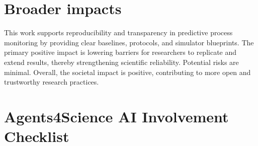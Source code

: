 \documentclass{article}
\theoremstyle{plain}
\theoremstyle{definition}
\theoremstyle{remark}
\begin{document}
	
	
	\section{Broader impacts}
	\label{sec:broader_impacts}
	This work supports reproducibility and transparency in predictive process monitoring by providing clear baselines, protocols, and simulator blueprints. The primary positive impact is lowering barriers for researchers to replicate and extend results, thereby strengthening scientific reliability. Potential risks are minimal. Overall, the societal impact is positive, contributing to more open and trustworthy research practices.
	
	
	
	
	
	
	
	
	
	
	
	
	
	
	
	
	
	
	
	
	
	
	
	
	
	
	\newpage
	
	\section*{Agents4Science AI Involvement Checklist}
	
\end{document}
